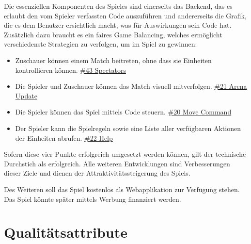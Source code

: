 \documentclass[11pt,a4paper]{scrartcl}
\let\oldsection\section
\renewcommand\section{\clearpage\oldsection}
\begin{document}
Die essenziellen Komponenten des Spieles sind einerseits das Backend, das es erlaubt den vom Spieler verfassten Code auszuführen und andererseits die Grafik, die es dem Benutzer ersichtlich macht, was für Auswirkungen sein Code hat. Zusätzlich dazu braucht es ein faires Game Balancing, welches ermöglicht verschiedenste Strategien zu verfolgen, um im Spiel zu gewinnen:

\begin{itemize}
  \item Zuschauer können einem Match beitreten, ohne dass sie Einheiten kontrollieren können. \href{https://dev.azure.com/schaumic/darwin/_workitems/edit/43/}{\#43 Spectators}
  \item Die Spieler und Zuschauer können das Match visuell mitverfolgen. \href{https://dev.azure.com/schaumic/darwin/_workitems/edit/21/}{\#21 Arena Update}
  \item Die Spieler können das Spiel mittels Code steuern. \href{https://dev.azure.com/schaumic/darwin/_workitems/edit/20/}{\#20 Move Command}
  \item Der Spieler kann die Spielregeln sowie eine Liste aller verfügbaren Aktionen der Einheiten abrufen. \href{https://dev.azure.com/schaumic/darwin/_workitems/edit/22/}{\#22 Help}
\end{itemize}

Sofern diese vier Punkte erfolgreich umgesetzt werden können, gilt der technische Durchstich als erfolgreich. Alle weiteren Entwicklungen sind Verbesserungen dieser Ziele und dienen der Attraktivitätssteigerung des Spiels.

Des Weiteren soll das Spiel kostenlos als Webapplikation zur Verfügung stehen. Das Spiel könnte später mittels Werbung finanziert werden.

\section{Qualitätsattribute}
\end{document}
